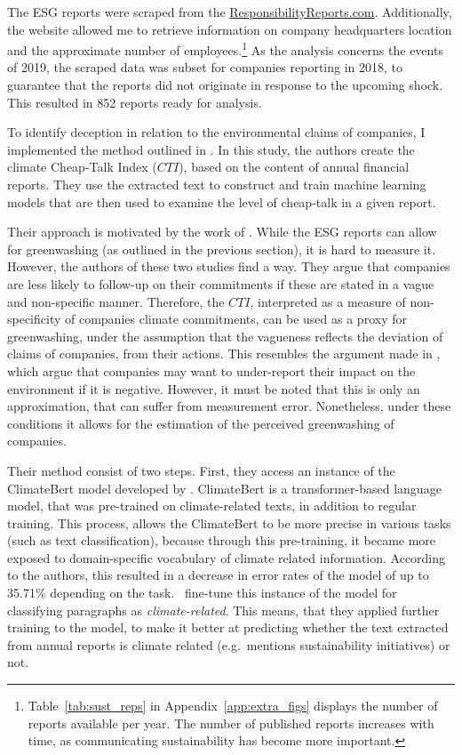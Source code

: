 \documentclass[12pt]{article}
\begin{document}
The ESG reports were scraped from the \href{https://responsibilityreports.com}{ResponsibilityReports.com}. Additionally, the website allowed me to retrieve information on company headquarters location and the approximate number of employees.\footnote{Table~\ref{tab:sust_reps} in Appendix~\ref{app:extra_figs} displays the number of reports available per year. The number of published reports increases with time, as communicating sustainability has become more important.} As the analysis concerns the events of 2019, the scraped data was subset for companies reporting in 2018, to guarantee that the reports did not originate in response to the upcoming shock. This resulted in 852 reports ready for analysis. 

To identify deception in relation to the environmental claims of companies, I implemented the method outlined in \textcite{binglerHowCheapTalk2024}. In this study, the authors create the climate Cheap-Talk Index ($CTI$), based on the content of annual financial reports. They use the extracted text to construct and train machine learning models that are then used to examine the level of cheap-talk in a given report. 

Their approach is motivated by the work of \textcite{coenAreCorporateClimate2022, ramusWhenAreCorporate2005}. While the ESG reports can allow for greenwashing (as outlined in the previous section), it is hard to measure it. However, the authors of these two studies find a way. They argue that companies are less likely to follow-up on their commitments if these are stated in a vague and non-specific manner. Therefore, the $CTI$, interpreted as a measure of non-specificity of companies climate commitments, can be used as a proxy for greenwashing, under the assumption that the vagueness reflects the deviation of claims of companies, from their actions. This resembles the argument made in \textcite{binglerCheapTalkCherrypicking2022,marquisScrutinyNormsSelective2016}, which argue that companies may want to under-report their impact on the environment if it is negative. However, it must be noted that this is only an approximation, that can suffer from measurement error. Nonetheless, under these conditions it allows for the estimation of the perceived greenwashing of companies. 

Their method consist of two steps. First, they access an instance of the ClimateBert model developed by \textcite{webersinkeCLIMATEBERTPretrainedLanguage2022}. ClimateBert is a transformer-based language model, that was pre-trained on climate-related texts, in addition to regular training. This process, allows the ClimateBert to be more precise in various tasks (such as text classification), because through this pre-training, it became more exposed to domain-specific vocabulary of climate related information. According to the authors, this resulted in a decrease in error rates of the model of up to 35.71\% depending on the task.~\citeauthor{binglerHowCheapTalk2024} fine-tune this instance of the model for classifying paragraphs as \textit{climate-related}. This means, that they applied further training to the model, to make it better at predicting whether the text extracted from annual reports is climate related (e.g.~mentions sustainability initiatives) or not. 
\end{document}
